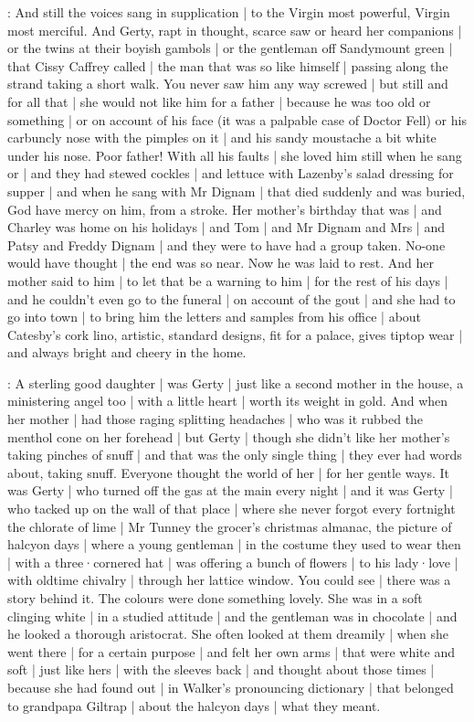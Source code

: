 :
And still the voices sang in supplication |
to the Virgin most powerful,
Virgin most merciful.
And Gerty,
rapt in thought,
scarce saw or heard her companions |
or the twins at their boyish gambols |
or the gentleman off Sandymount green |
that Cissy Caffrey called |
the man that was so like himself |
passing along the strand taking a short walk.
You never saw him any way screwed |
but still and for all that |
she would not like him for a father |
because he was too old or something |
or on account of his face
(it was a palpable case of Doctor Fell)%
or his carbuncly nose with the pimples on it |
and his sandy moustache a bit white under his nose.
Poor father!
With all his faults |
she loved him still when he sang
or
 |
and they had stewed cockles |
and lettuce with Lazenby's salad dressing for supper |
and when he sang
 with Mr Dignam |
that died suddenly and was buried,
God have mercy on him,
from a stroke.
Her mother's birthday that was |
and Charley was home on his holidays |
and Tom |
and Mr Dignam and Mrs |
and Patsy and Freddy Dignam |
and they were to have had a group taken.
No-one would have thought |
the end was so near.
Now he was laid to rest.
And her mother said to him |%
to let that be a warning to him |
for the rest of his days |
and he couldn't even go to the funeral |
on account of the gout |
and she had to go into town |
to bring him the letters and samples
from his office |
about Catesby's cork lino,
artistic,
standard designs,
fit for a palace,
gives tiptop wear |
and always bright and cheery in the home.

:
A sterling good daughter |
was Gerty |
just like a second mother in the house,
a ministering angel too |
with a little heart |
worth its weight in gold.
And when her mother |
had those raging splitting headaches |
who was it rubbed the menthol cone on her forehead |
but Gerty |
though she didn't like her mother's taking pinches of snuff |
and that was the only single thing |
they ever had words about,
taking snuff.%
Everyone thought the world of her |
for her gentle ways.
It was Gerty |
who turned off the gas at the main every night |
and it was Gerty |
who tacked up on the wall of that place |
where she never forgot every fortnight the chlorate of lime |
Mr Tunney the grocer's christmas almanac,
the picture of halcyon days |
where a young gentleman |
in the costume they used to wear then |
with a three·cornered hat |
was offering a bunch of flowers |
to his lady·love |
with oldtime chivalry |
through her lattice window.
You could see |
there was a story behind it.
The colours were done something lovely.
She was in a soft clinging white |
in a studied attitude |
and the gentleman was in chocolate |
and he looked a thorough aristocrat.
She often looked at them dreamily |%
when she went there |
for a certain purpose |
and felt her own arms |
that were white and soft |
just like hers |
with the sleeves back |
and thought about those times |
because she had found out |
in Walker's pronouncing dictionary |
that belonged to grandpapa Giltrap |
about the halcyon days |
what they meant.

